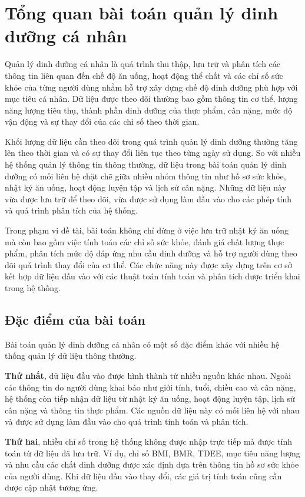 \documentclass[12pt, a4paper]{report}
\begin{document}
\section{Tổng quan bài toán quản lý dinh dưỡng cá nhân}Quản lý dinh dưỡng cá nhân là quá trình thu thập, lưu trữ và phân tích các thông tin liên quan đến chế độ ăn uống, hoạt động thể chất và các chỉ số sức khỏe của từng người dùng nhằm hỗ trợ xây dựng chế độ dinh dưỡng phù hợp với mục tiêu cá nhân. Dữ liệu được theo dõi thường bao gồm thông tin cơ thể, lượng năng lượng tiêu thụ, thành phần dinh dưỡng của thực phẩm, cân nặng, mức độ vận động và sự thay đổi của các chỉ số theo thời gian.

Khối lượng dữ liệu cần theo dõi trong quá trình quản lý dinh dưỡng thường tăng lên theo thời gian và có sự thay đổi liên tục theo từng ngày sử dụng. So với nhiều hệ thống quản lý thông tin thông thường, dữ liệu trong bài toán quản lý dinh dưỡng có mối liên hệ chặt chẽ giữa nhiều nhóm thông tin như hồ sơ sức khỏe, nhật ký ăn uống, hoạt động luyện tập và lịch sử cân nặng. Những dữ liệu này vừa được lưu trữ để theo dõi, vừa được sử dụng làm đầu vào cho các phép tính và quá trình phân tích của hệ thống.

Trong phạm vi đề tài, bài toán không chỉ dừng ở việc lưu trữ nhật ký ăn uống mà còn bao gồm việc tính toán các chỉ số sức khỏe, đánh giá chất lượng thực phẩm, phân tích mức độ đáp ứng nhu cầu dinh dưỡng và hỗ trợ người dùng theo dõi quá trình thay đổi của cơ thể. Các chức năng này được xây dựng trên cơ sở kết hợp dữ liệu đầu vào với các thuật toán tính toán và phân tích được triển khai trong hệ thống.

\subsection{Đặc điểm của bài toán}Bài toán quản lý dinh dưỡng cá nhân có một số đặc điểm khác với nhiều hệ thống quản lý dữ liệu thông thường.

\textbf{Thứ nhất}, dữ liệu đầu vào được hình thành từ nhiều nguồn khác nhau. Ngoài các thông tin do người dùng khai báo như giới tính, tuổi, chiều cao và cân nặng, hệ thống còn tiếp nhận dữ liệu từ nhật ký ăn uống, hoạt động luyện tập, lịch sử cân nặng và thông tin thực phẩm. Các nguồn dữ liệu này có mối liên hệ với nhau và được sử dụng làm đầu vào cho quá trình tính toán và phân tích.

\textbf{Thứ hai}, nhiều chỉ số trong hệ thống không được nhập trực tiếp mà được tính toán từ dữ liệu đã lưu trữ. Ví dụ, chỉ số BMI, BMR, TDEE, mục tiêu năng lượng và nhu cầu các chất dinh dưỡng được xác định dựa trên thông tin hồ sơ sức khỏe của người dùng. Khi dữ liệu đầu vào thay đổi, các giá trị tính toán cũng cần được cập nhật tương ứng.
\end{document}
